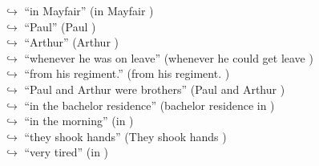 \documentclass[11pt,a4paper, onecolumn]{article}
\begin{document}
\begin{figure}[t] \small \begin{tcolorbox}[boxsep=0pt,left=5pt,right=0pt,top=2pt,colback = yellow!5] \begin{dialogue}
 \small 
\colorbox{pink!25}{$\hookrightarrow$}
{ ``in Mayfair'' (in Mayfair ) }
\\
\colorbox{pink!25}{$\hookrightarrow$}
{ ``Paul'' (Paul ) }
\\
\colorbox{pink!25}{$\hookrightarrow$}
{ ``Arthur'' (Arthur ) }
\\
\colorbox{pink!25}{$\hookrightarrow$}
{ ``whenever he was on leave'' (whenever he could get leave ) }
\\
\colorbox{pink!25}{$\hookrightarrow$}
{ ``from his regiment.'' (from his regiment. ) }
\\
\colorbox{pink!25}{$\hookrightarrow$}
{ ``Paul and Arthur were brothers'' (Paul and Arthur ) }
\\
\colorbox{pink!25}{$\hookrightarrow$}
{ ``in the bachelor residence'' (bachelor residence in ) }
\\
\colorbox{pink!25}{$\hookrightarrow$}
{ ``in the morning'' (in ) }
\\
\colorbox{pink!25}{$\hookrightarrow$}
{ ``they shook hands'' (They shook hands ) }
\\
\colorbox{pink!25}{$\hookrightarrow$}
{ ``very tired'' (in ) }
\\
 \end{dialogue}\end{tcolorbox}\end{figure}
\end{document}
